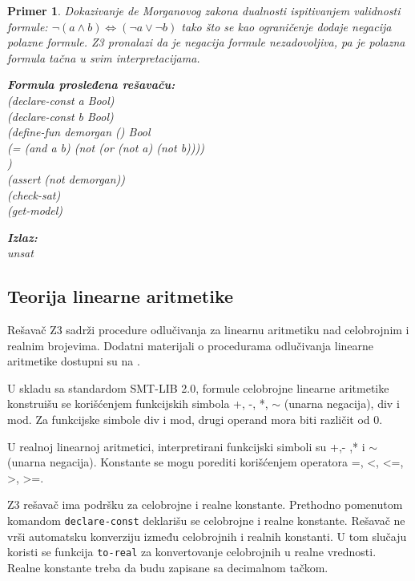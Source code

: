 \documentclass[12pt,oneside]{memoir}
\newcommand\tab[1][0.5cm]{\hspace*{#1}}
\newtheorem{primer}{Primer}
\begin{document}
\begin{primer} Dokazivanje de Morganovog zakona dualnosti ispitivanjem validnosti formule: $\neg{(a \land b)} \Leftrightarrow (\neg{a} \lor \neg{b}) $ tako što se kao ograničenje dodaje negacija polazne formule. Z3 pronalazi da je negacija formule nezadovoljiva, pa je polazna formula tačna u svim interpretacijama. \\

\hspace{-0.6cm}
\begin{minipage}[b]{0.5\textwidth}
\textbf{Formula prosleđena rešavaču:}
\\(declare-const a Bool)
\\(declare-const b Bool)
\\(define-fun demorgan () Bool
\\\tab (= (and a b) (not (or (not a) (not b))))
\\)
\\(assert (not demorgan))
\\(check-sat) 
\\(get-model)
\end{minipage}
\hspace{1.5cm}
\begin{minipage}[t]{0.4\textwidth}
\vspace{-5.35cm}
\textbf{Izlaz:}
\\unsat
\end{minipage}
\end{primer}


\subsection{Teorija linearne aritmetike} 

Rešavač Z3 sadrži procedure odlučivanja za linearnu aritmetiku nad celobrojnim i realnim brojevima. Dodatni materijali o procedurama odlučivanja linearne aritmetike dostupni su na \cite{FastLinearArithmetic}.
\par

U skladu sa standardom SMT-LIB 2.0, formule celobrojne linearne aritmetike konstruišu se korišćenjem funkcijskih simbola +, -, *, $\sim$ (unarna negacija), div i mod. Za funkcijske simbole div i mod, drugi operand mora biti različit od 0. 

U realnoj linearnoj aritmetici, interpretirani funkcijski simboli su +,- ,* i $\sim$(unarna negacija). Konstante se mogu porediti korišćenjem operatora =, <, <=, >, >=. 
\\
\par
Z3 rešavač ima podršku za celobrojne i realne konstante. Prethodno pomenutom komandom \texttt{declare-const} deklarišu se celobrojne i realne konstante. Rešavač ne vrši automatsku konverziju između celobrojnih i realnih konstanti. U tom slučaju koristi se funkcija \texttt{to-real} za konvertovanje celobrojnih u realne vrednosti.
Realne konstante treba da budu zapisane sa decimalnom tačkom.
\end{document}
